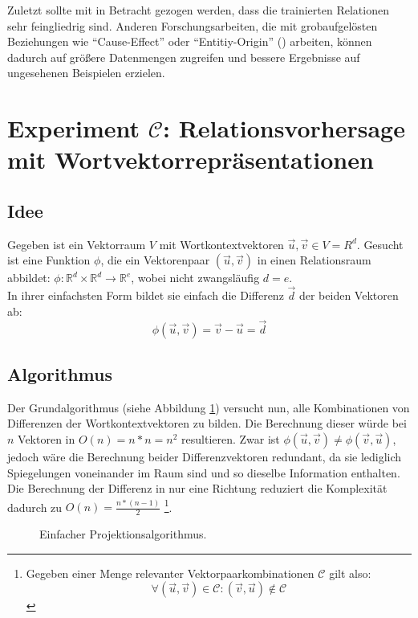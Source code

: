 Zuletzt sollte mit in Betracht gezogen werden, dass die trainierten Relationen sehr feingliedrig sind. Anderen Forschungsarbeiten,
 die mit grobaufgelösten Beziehungen wie ``Cause-Effect'' oder ``Entitiy-Origin''
(\cite{hendrickx2009semeval}) arbeiten, können dadurch auf größere Datenmengen zugreifen und bessere Ergebnisse auf
ungesehenen Beispielen erzielen.

\section{Experiment $\mathcal{C}$: Relationsvorhersage mit Wortvektorrepräsentationen}

\subsection{Idee}

Gegeben ist ein Vektorraum $V$ mit Wortkontextvektoren $\vec{u}, \vec{v} \in V = {R}^d$.
Gesucht ist eine Funktion $\phi$, die ein Vektorenpaar $(\vec{u}, \vec{v})$ in einen Relationsraum abbildet:
$\phi: \mathbb{R}^d \times \mathbb{R}^d \to \mathbb{R}^e$, wobei
nicht zwangsläufig $d = e$.\\
In ihrer einfachsten Form bildet sie einfach die Differenz $\vec{d}$ der beiden Vektoren ab:
\begin{equation}
  \phi(\vec{u}, \vec{v}) = \vec{v} - \vec{u} = \vec{d}
\end{equation}

\subsection{Algorithmus}

Der Grundalgorithmus (siehe Abbildung \ref{fig:algo1}) versucht nun, alle Kombinationen von Differenzen der
Wortkontextvektoren zu bilden. Die Berechnung dieser würde bei $n$ Vektoren in $O(n) = n * n = n^2$ resultieren.
Zwar ist $\phi(\vec{u}, \vec{v}) \neq \phi(\vec{v}, \vec{u})$, jedoch wäre die Berechnung beider Differenzvektoren redundant,
da sie lediglich Spiegelungen voneinander im Raum sind und so dieselbe Information enthalten. Die Berechnung
der Differenz in nur eine Richtung reduziert die Komplexität dadurch zu $O(n) = \frac{n * (n-1)}{2}$
\footnote{
Gegeben einer Menge relevanter Vektorpaarkombinationen $\mathcal{C}$ gilt also:
\[
  \forall (\vec{u}, \vec{v}) \in \mathcal{C}: (\vec{v}, \vec{u}) \notin \mathcal{C}
\]
}.

\begin{figure}[h]
  \centering
  \begin{algorithm}[H]
  \end{algorithm}
  \caption[Einfacher Projektionsalgorithmus]{Einfacher Projektionsalgorithmus.\label{fig:algo1}}
\end{figure}

